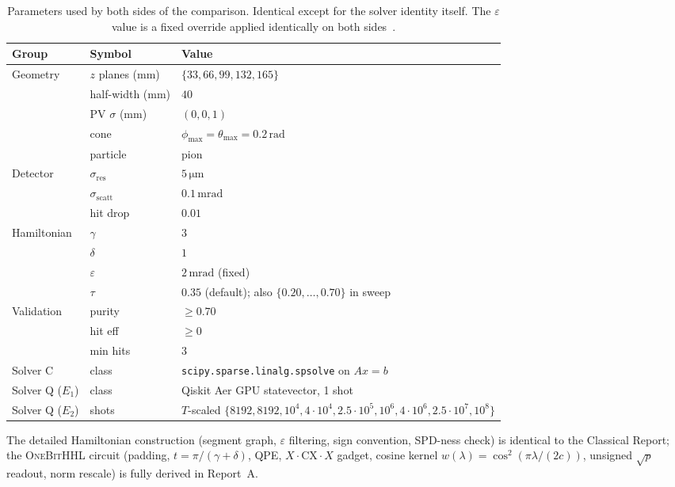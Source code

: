 \documentclass[11pt,a4paper]{article}
\begin{document}
\begin{table}[h]
\centering
\small
\caption{Parameters used by both sides of the comparison. Identical except for the solver
identity itself. The $\varepsilon$ value is a fixed override applied identically on both
sides~\cite{Funke2025}.}
\label{tab:params}
\begin{tabular}{lll}
\toprule
Group & Symbol & Value \\
\midrule
Geometry & $z$ planes (mm) & $\{33, 66, 99, 132, 165\}$ \\
         & half-width (mm) & $40$ \\
         & PV $\sigma$ (mm) & $(0,0,1)$ \\
         & cone & $\phi_{\max} = \theta_{\max} = 0.2\,\mathrm{rad}$ \\
         & particle & pion \\
\midrule
Detector & $\sigma_{\mathrm{res}}$ & $5\,\mathrm{\mu m}$ \\
         & $\sigma_{\mathrm{scatt}}$ & $0.1\,\mathrm{mrad}$ \\
         & hit drop & $0.01$ \\
\midrule
Hamiltonian & $\gamma$ & $3$ \\
            & $\delta$ & $1$ \\
            & $\varepsilon$ & $2\,\mathrm{mrad}$ (fixed) \\
            & $\tau$       & $0.35$ (default); also $\{0.20,\ldots,0.70\}$ in sweep \\
\midrule
Validation & purity & $\ge 0.70$ \\
           & hit eff & $\ge 0$ \\
           & min hits & $3$ \\
\midrule
Solver C   & class    & \texttt{scipy.sparse.linalg.spsolve} on $A x = b$ \\
Solver Q ($E_1$) & class & Qiskit Aer GPU statevector, 1 shot~\cite{qiskit} \\
Solver Q ($E_2$) & shots & $T$-scaled $\{8192, 8192, 10^4, 4\!\cdot\!10^4, 2.5\!\cdot\!10^5,
                                  10^6, 4\!\cdot\!10^6, 2.5\!\cdot\!10^7, 10^8\}$ \\
\bottomrule
\end{tabular}
\end{table}

The detailed Hamiltonian construction (segment graph, $\varepsilon$ filtering, sign
convention, SPD-ness check) is identical to the Classical Report; the
\textsc{OneBitHHL} circuit (padding, $t = \pi/(\gamma+\delta)$, QPE,
$X{\cdot}\mathrm{CX}{\cdot}X$ gadget, cosine kernel $w(\lambda) = \cos^2(\pi\lambda/(2c))$,
unsigned $\sqrt{p}$ readout, norm rescale) is fully derived in Report~A.
\end{document}

